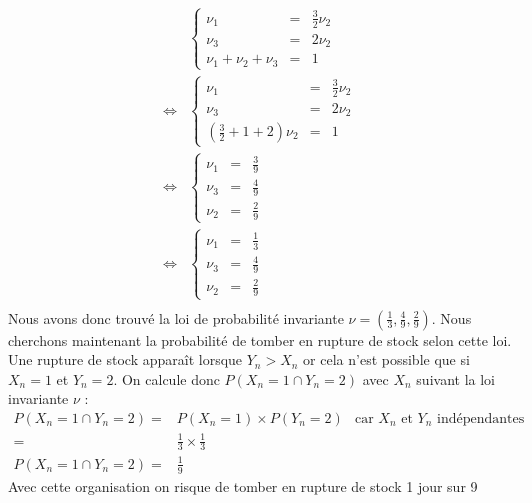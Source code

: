 \documentclass[10pt,a4paper,twoside]{article}
\begin{document}
\renewcommand\arraystretch{1.2}
\begin{align*}
& \left\lbrace \begin{array}{rcl}
\nu_{1} &=& \frac{3}{2}\nu_{2}\\
\nu_{3} &=& 2\nu_{2}\\
\nu_{1}+\nu_{2}+\nu_{3} &=& 1
\end{array}\right.\\
\Leftrightarrow & \left\lbrace \begin{array}{rcl}
\nu_{1} &=& \frac{3}{2}\nu_{2}\\
\nu_{3} &=& 2\nu_{2}\\
\left(\frac{3}{2}+1+2\right)\nu_{2} &=& 1
\end{array}\right.\\
\Leftrightarrow & \left\lbrace \begin{array}{rcl}
\nu_{1} &=& \frac{3}{9}\\
\nu_{3} &=& \frac{4}{9}\\
\nu_{2} &=& \frac{2}{9}
\end{array}\right.\\
\Leftrightarrow & \left\lbrace \begin{array}{rcl}
\nu_{1} &=& \frac{1}{3}\\
\nu_{3} &=& \frac{4}{9}\\
\nu_{2} &=& \frac{2}{9}
\end{array}\right.\\
\end{align*}
\renewcommand\arraystretch{1}
Nous avons donc trouvé la loi de probabilité invariante $\nu=\left(\frac{1}{3},\frac{4}{9},\frac{2}{9}\right)$. Nous cherchons maintenant la probabilité de tomber en rupture de stock selon cette loi. Une rupture de stock apparaît lorsque $Y_{n}>X_{n}$ or cela n'est possible que si $X_{n}=1$ et $Y_{n}=2$. On calcule donc $P(X_{n}=1 \cap Y_{n}=2)$ avec $X_{n}$ suivant la loi invariante $\nu$ :
\begin{align*}
P(X_{n}=1 \cap Y_{n}=2)=& P(X_{n}=1) \times P(Y_{n}=2) & \text{car }X_{n}\text{ et }Y_{n}\text{ indépendantes}\\
=& \frac{1}{3} \times \frac{1}{3}\\
P(X_{n}=1 \cap Y_{n}=2)=& \frac{1}{9}
\end{align*}
Avec cette organisation on risque de tomber en rupture de stock 1 jour sur 9
\end{document}
